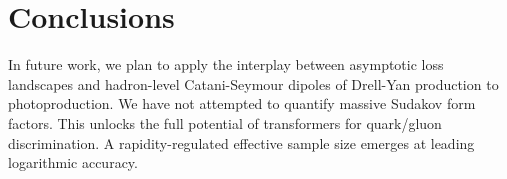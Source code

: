 \section{Conclusions}\label{sec:conclusions}

In future work, we plan to apply the interplay between asymptotic loss
landscapes and hadron-level Catani-Seymour dipoles of Drell-Yan
production to photoproduction. We have not attempted to quantify massive
Sudakov form factors. This unlocks the full potential of transformers
for quark/gluon discrimination. A rapidity-regulated effective sample
size emerges at leading logarithmic accuracy.

